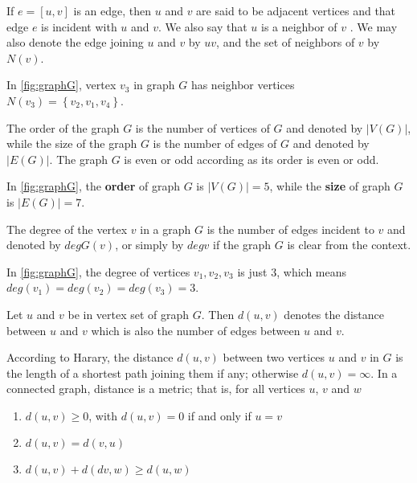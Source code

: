 \begin{defn}\rm
\cite{lapura}If $e = [u, v]$ is an edge, then $u$ and $v$ are said to be adjacent vertices and that edge $e$ is incident with $u$ and $v$. We also say that $u$ is a neighbor of $v$ . We may also denote the edge joining $u$ and $v$ by $uv$, and the set of neighbors of $v$ by $N(v)$.
\end{defn}

\begin{e.g.}\rm
In \ref{fig:graphG}, vertex $v_3$ in graph $G$ has neighbor vertices $N(v_3)=\left\lbrace v_2,v_1,v_4 \right\rbrace $. 
\end{e.g.}

\begin{defn} \rm
\cite{lapura}The order of the graph $G$ is the number of vertices of $G$ and denoted by $|V (G)|$, while the size of the graph $G$ is the number of edges of $G$
and denoted by $|E(G)|$. The graph $G$ is even or odd according as its order is
even or odd.
\end{defn}

\begin{e.g.}\rm
In \ref{fig:graphG}, the \textbf{order} of graph $G$ is $|V(G)|=5$, while the \textbf{size} of graph $G$ is $|E(G)|=7$. 
\end{e.g.}

\begin{defn}\rm
\cite{gt}The degree of the vertex $v$ in a graph $G$ is the number of
edges incident to $v$ and denoted by $degG(v)$, or simply by $deg v$ if the graph $G$ is clear from the context.
\end{defn}

\begin{e.g.}\rm
In \ref{fig:graphG}, the degree of vertices $v_1,v_2,v_3$ is just $3$, which means $deg(v_1)=deg(v_2)=deg(v_3)=3$.
\end{e.g.}

\begin{defn} \rm
\cite{lapura} Let $u$ and $v$ be in vertex set of graph $G$. Then $d(u,v)$ denotes the distance between $u$ and $v$ which is also the number of edges between $u$ and $v$.
\end{defn}

\begin{defn}\rm
\cite{hararygt} According to Harary, the distance $d(u,v)$ between two vertices $u$ and $v$ in $G$ is the length of a shortest path joining them if any; otherwise $d(u,v)=\infty$. In a connected graph, distance is a metric; that is, for all vertices $u$, $v$ and $w$

\begin{enumerate}
\item $d(u,v)\geq 0$, with $d(u,v)=0$ if and only if $u=v$
\item $d(u,v)=d(v,u)$
\item $d(u,v)+d(dv,w)\geq d(u,w)$
\end{enumerate}

\end{defn}

